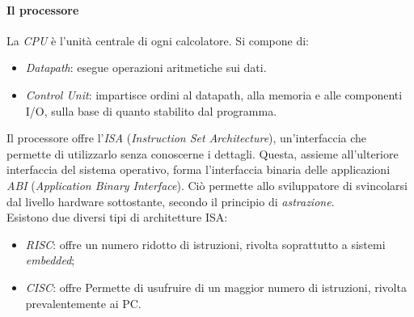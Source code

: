 \documentclass[class=book, crop=false]{standalone}
\begin{document}
\paragraph*{Il processore}
La \emph{CPU} è l'unità centrale di ogni calcolatore. Si compone di:
\begin{itemize}[noitemsep]
	\item \emph{Datapath}: esegue operazioni aritmetiche sui dati.
	\item \emph{Control Unit}: impartisce ordini al datapath, alla memoria e alle componenti I/O, sulla base di quanto stabilito dal programma.
\end{itemize}
Il processore offre l'\emph{ISA} (\emph{Instruction Set Architecture}), un'interfaccia che permette di utilizzarlo senza conoscerne i dettagli. Questa, assieme all'ulteriore interfaccia del sistema operativo, forma l'interfaccia binaria delle applicazioni \emph{ABI} (\emph{Application Binary Interface}). Ciò permette allo sviluppatore di svincolarsi dal livello hardware sottostante, secondo il principio di \emph{astrazione}.\\ Esistono due diversi tipi di architetture ISA:
\begin{itemize}[noitemsep,nolistsep]
	\item \emph{RISC}: offre un numero ridotto di istruzioni, rivolta soprattutto a sistemi \emph{embedded};
	\item \emph{CISC}: offre Permette di usufruire di un maggior numero di istruzioni, rivolta prevalentemente ai PC.
\end{itemize}
\end{document}
